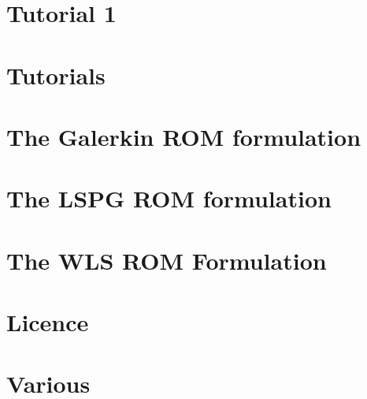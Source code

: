 \let\mypdfximage\pdfximage\def\pdfximage{\immediate\mypdfximage}\documentclass[twoside]{book}
\newcommand{\+}{\discretionary{\mbox{\scriptsize$\hookleftarrow$}}{}{}}
\newcommand{\clearemptydoublepage}{%
  \newpage{\pagestyle{empty}\cleardoublepage}%
}
\begin{document}
\chapter{Tutorial 1}
\label{md_pages_tutorials_tutorial1}

\chapter{Tutorials}
\label{md_pages_tutorials}

\chapter{The Galerkin R\+OM formulation}
\label{md_pages_various_formulation_galerkin}

\chapter{The L\+S\+PG R\+OM formulation}
\label{md_pages_various_formulation_lspg}

\chapter{The W\+LS R\+OM Formulation}
\label{md_pages_various_formulation_wls}

\chapter{Licence}
\label{md_pages_various_license}

\chapter{Various}
\label{md_pages_various}


\backmatter
\newpage
{}
\clearemptydoublepage
{}
\printindex
\end{document}
